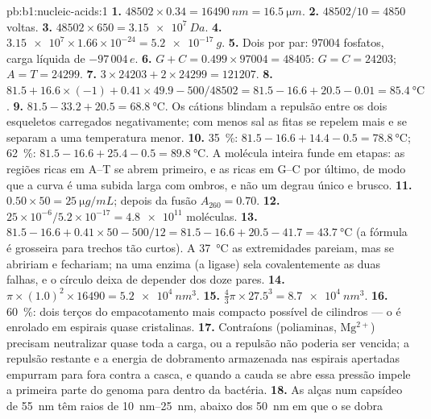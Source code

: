 \begin{solution}{pb:b1:nucleic-acids:1}
\textbf{1.} $\num{48502}\times 0.34 = \qty{16490}{nm} = \qty{16.5}{\micro m}$.
\textbf{2.} $\num{48502}/10 = 4850$ voltas.
\textbf{3.} $\num{48502}\times 650 = \qty{3.15e7}{Da}$.
\textbf{4.} $\num{3.15e7}\times 1.66\times 10^{-24} = \qty{5.2e-17}{g}$.
\textbf{5.} Dois por par: \num{97004} fosfatos, carga líquida de
$-97\,004\,e$.
\textbf{6.} $G + C = 0.499\times\num{97004} = \num{48405}$: $G = C =
\num{24203}$; $A = T = \num{24299}$.
\textbf{7.} $3\times\num{24203} + 2\times\num{24299} = \num{121207}$.
\textbf{8.} $81.5 + 16.6\times(-1) + 0.41\times 49.9 - 500/48502 =
81.5 - 16.6 + 20.5 - 0.01 = \qty{85.4}{\celsius}$.
\textbf{9.} $81.5 - 33.2 + 20.5 = \qty{68.8}{\celsius}$. Os cátions
blindam a repulsão entre os dois esqueletos carregados negativamente;
com menos sal as fitas se repelem mais e se separam a uma temperatura
menor.
\textbf{10.} \qty{35}{\%}: $81.5 - 16.6 + 14.4 - 0.5 =
\qty{78.8}{\celsius}$; \qty{62}{\%}: $81.5 - 16.6 + 25.4 - 0.5 =
\qty{89.8}{\celsius}$. A molécula inteira funde em etapas: as regiões
ricas em A--T se abrem primeiro, e as ricas em G--C por último, de modo
que a curva é uma subida larga com ombros, e não um degrau único e
brusco.
\textbf{11.} $0.50\times 50 = \qty{25}{\micro g/mL}$; depois da fusão
$A_{260} = 0.70$.
\textbf{12.} $25\times 10^{-6}/5.2\times 10^{-17} = \num{4.8e11}$ moléculas.
\textbf{13.} $81.5 - 16.6 + 0.41\times 50 - 500/12 = 81.5 - 16.6 + 20.5
- 41.7 = \qty{43.7}{\celsius}$ (a fórmula é grosseira para trechos tão
curtos). A \qty{37}{\celsius} as extremidades pareiam, mas se abririam e
fechariam; na  uma enzima (a ligase) sela covalentemente as duas
falhas, e o círculo deixa de depender dos doze pares.
\textbf{14.} $\pi\times(1.0)^2\times\num{16490} = \qty{5.2e4}{nm^3}$.
\textbf{15.} $\frac{4}{3}\pi\times 27.5^3 = \qty{8.7e4}{nm^3}$.
\textbf{16.} \qty{60}{\%}: dois terços do empacotamento mais compacto
possível de cilindros --- o  é enrolado em espirais quase
cristalinas.
\textbf{17.} Contraíons (poliaminas, $\mathrm{Mg^{2+}}$) precisam
neutralizar quase toda a carga, ou a repulsão não poderia ser vencida; a
repulsão restante e a energia de dobramento armazenada nas espirais
apertadas empurram para fora contra a casca, e quando a cauda se abre
essa pressão impele a primeira parte do genoma para dentro da bactéria.
\textbf{18.} As alças num capsídeo de \qty{55}{nm} têm raios de
\qtyrange{10}{25}{nm}, abaixo dos \qty{50}{nm} em que o  se dobra

\end{solution}
